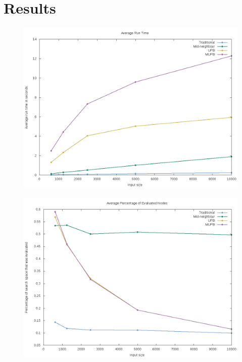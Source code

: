 \documentclass[12pt]{article}
\begin{document}
\section{Results}
\begin{figure}[H]
        \centering
        \includegraphics[scale=.5]{time_plot_result}
\end{figure}
\begin{figure}[H]
        \centering
        \includegraphics[scale=.5]{evaluations_plot_result}
\end{figure}
\end{document}
